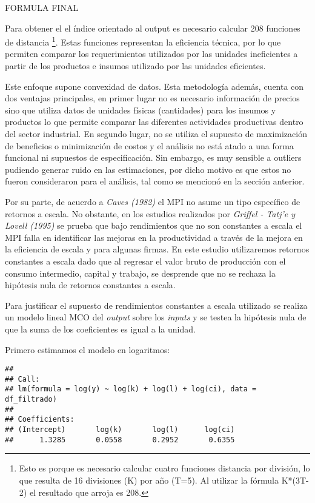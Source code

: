 \documentclass[
]{article}
\begin{document}
FORMULA FINAL

Para obtener el el índice orientado al output es necesario calcular 208
funciones de distancia \footnote{Esto es porque es necesario calcular
  cuatro funciones distancia por división, lo que resulta de 16
  divisiones (K) por año (T=5). Al utilizar la fórmula K*(3T-2) el
  resultado que arroja es 208.}. Estas funciones representan la
eficiencia técnica, por lo que permiten comparar los requerimientos
utilizados por las unidades ineficientes a partir de los productos e
insumos utilizado por las unidades eficientes.

Este enfoque supone convexidad de datos. Esta metodología además, cuenta
con dos ventajas principales, en primer lugar no es necesario
información de precios sino que utiliza datos de unidades físicas
(cantidades) para los insumos y productos lo que permite comparar las
diferentes actividades productivas dentro del sector industrial. En
segundo lugar, no se utiliza el supuesto de maximización de beneficios o
minimización de costos y el análisis no está atado a una forma funcional
ni supuestos de especificación. Sin embargo, es muy sensible a outliers
pudiendo generar ruido en las estimaciones, por dicho motivo es que
estos no fueron consideraron para el análisis, tal como se mencionó en
la sección anterior.

Por su parte, de acuerdo a \emph{Caves (1982)} el MPI no asume un tipo
específico de retornos a escala. No obstante, en los estudios realizados
por \emph{Griffel - Tatj'e y Lovell (1995)} se prueba que bajo
rendimientos que no son constantes a escala el MPI falla en identificar
las mejoras en la productividad a través de la mejora en la eficiencia
de escala y para algunas firmas. En este estudio utilizaremos retornos
constantes a escala dado que al regresar el valor bruto de producción
con el consumo intermedio, capital y trabajo, se desprende que no se
rechaza la hipótesis nula de retornos constantes a escala.

Para justificar el supuesto de rendimientos constantes a escala
utilizado se realiza un modelo lineal MCO del \emph{output} sobre los
\emph{inputs} y se testea la hipótesis nula de que la suma de los
coeficientes es igual a la unidad.

Primero estimamos el modelo en logaritmos:

\begin{verbatim}
## 
## Call:
## lm(formula = log(y) ~ log(k) + log(l) + log(ci), data = df_filtrado)
## 
## Coefficients:
## (Intercept)       log(k)       log(l)      log(ci)  
##      1.3285       0.0558       0.2952       0.6355
\end{verbatim}
\end{document}

